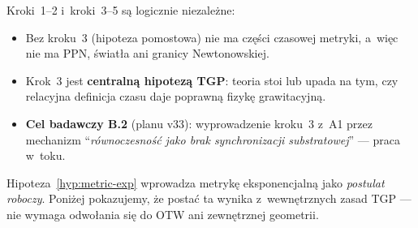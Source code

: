 \begin{remark}\label{rem:metric-steps-independence}
Kroki~1--2 i~kroki~3--5 s\k{a} logicznie niezale\.zne:
\begin{itemize}[nosep]
  \item Bez kroku~3 (hipoteza pomostowa) nie ma cz\k{e}\'sci czasowej metryki,
    a~wi\k{e}c nie ma PPN, \'swiat\l{}a ani granicy Newtonowskiej.
  \item Krok~3 jest \textbf{centraln\k{a} hipotez\k{a} TGP}:
    teoria stoi lub upada na tym, czy relacyjna definicja czasu
    daje poprawn\k{a} fizyk\k{e} grawitacyjn\k{a}.
  \item \textbf{Cel badawczy B.2} (planu v33):
    wyprowadzenie kroku~3 z~A1 przez mechanizm
    ``\textit{równoczesność jako brak synchronizacji
    substratowej}'' --- praca w~toku.
\end{itemize}
\end{remark}

Hipoteza~\ref{hyp:metric-exp} wprowadza metryk\k{e} eksponencjaln\k{a}
jako \emph{postulat roboczy}. Poni\.zej pokazujemy, \.ze posta\'c ta
wynika z~wewn\k{e}trznych zasad TGP --- nie wymaga odwo\l{}ania si\k{e}
do OTW ani zewn\k{e}trznej geometrii.

